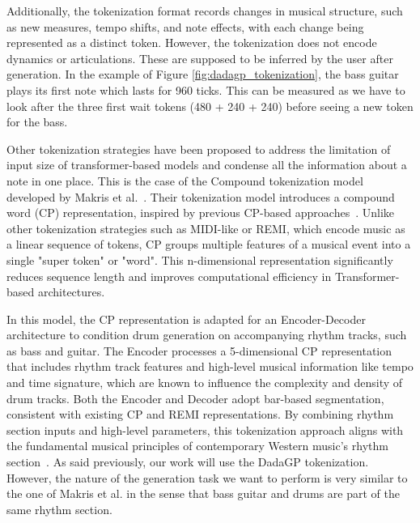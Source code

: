 Additionally, the tokenization format records changes in musical structure, such as new measures, tempo shifts, and note effects, with each change being represented as a distinct token.
However, the tokenization does not encode dynamics or articulations. These are supposed to be inferred by the user after generation.
In the example of Figure \ref{fig:dadagp_tokenization}, the bass guitar plays its first note which lasts for 960 ticks.
This can be measured as we have to look after the three first wait tokens (480 + 240 + 240) before seeing a new token for the bass.


Other tokenization strategies have been proposed to address the limitation of input size of transformer-based models and condense all the information about a note in one place.
This is the case of the Compound tokenization model developed by Makris et al.~\cite{makris_conditional_2022}.
Their tokenization model introduces a compound word (CP) representation, inspired by previous CP-based approaches~\cite{hsiao_compound_2021}.
Unlike other tokenization strategies such as MIDI-like or REMI, which encode music as a linear sequence of tokens, CP groups multiple features of a musical event into a single "super token" or "word".
This n-dimensional representation significantly reduces sequence length and improves computational efficiency in Transformer-based architectures.


In this model, the CP representation is adapted for an Encoder-Decoder architecture to condition drum generation on accompanying rhythm tracks, such as bass and guitar.
The Encoder processes a 5-dimensional CP representation that includes rhythm track features and high-level musical information like tempo and time signature, which are known to influence the complexity and density of drum tracks.
Both the Encoder and Decoder adopt bar-based segmentation, consistent with existing CP and REMI representations.
By combining rhythm section inputs and high-level parameters, this tokenization approach aligns with the fundamental musical principles of contemporary Western music's rhythm section~\cite{makris_conditional_2022}.
As said previously, our work will use the DadaGP tokenization. However, the nature of the generation task we want to perform is very similar to the one of Makris et al. in the sense that bass guitar and drums are part of the same rhythm section.



